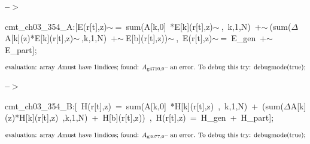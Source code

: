 \documentclass[fleqn]{article}
\begin{document}
\noindent
\begin{minipage}[t]{4.000000em}\color{red}\bfseries
 --\ensuremath{\ensuremath{>}}	
\end{minipage}
\begin{minipage}[t]{\textwidth}\color{blue}
cmt\_ch03\_354\_A:[E(r[t],z)\ensuremath{\sim\ }=\ sum(A[k,0]\ *E[k](r[t],z)\ensuremath{\sim\ },\ k,1,N)\ +\ensuremath{\sim\ }(sum(\ensuremath{\Delta}A[k](z)*E[k](r[t],z)\ensuremath{\sim\ },k,1,N)\ +\ensuremath{\sim\ }E[b](r[t],z))\ensuremath{\sim\ },\ E(r[t],z)\ensuremath{\sim\ }=\ E\_gen\ +\ensuremath{\sim\ }E\_part];
\end{minipage}
\[\displaystyle \mbox{}\\\mbox{%
evaluation: array }A\mbox{%
 must have }1\mbox{%
 indices; found: }{A_{\ensuremath{\mathrm{g4710}},0}}\mbox{%
 -- an error. To debug this try: debugmode(true);}\mbox{}
\]


\noindent
\begin{minipage}[t]{4.000000em}\color{red}\bfseries
 --\ensuremath{\ensuremath{>}}	
\end{minipage}
\begin{minipage}[t]{\textwidth}\color{blue}
cmt\_ch03\_354\_B:[\ H(r[t],z)\ =\ sum(A[k,0]\ *H[k](r[t],z)\ ,\ k,1,N)\ +\ (sum(\ensuremath{\Delta}A[k](z)*H[k](r[t],z)\ ,k,1,N)\ +\ H[b](r[t],z))\ ,\ H(r[t],z)\ =\ H\_gen\ +\ H\_part];
\end{minipage}
\[\displaystyle \mbox{}\\\mbox{%
evaluation: array }A\mbox{%
 must have }1\mbox{%
 indices; found: }{A_{\ensuremath{\mathrm{g3077}},0}}\mbox{%
 -- an error. To debug this try: debugmode(true);}\mbox{}
\]
\end{document}
